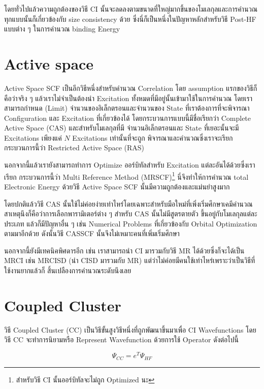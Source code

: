 โดยทั่วไปแล้วความถูกต้องของวิธี CI นั้นจะลดลงตามขนาดที่ใหญ่มากขึ้นของโมเลกุลและการคำนวณทุกแบบนั้นก็เกี่ยวข้องกับ
size consistency ด้วย ซึ่งนี่ก็เป็นหนึ่งในปัญหาหลักสำหรับวิธี Post-HF แบบต่าง ๆ ในการคำนวณ binding Energy

\section{Active space}

Active Space SCF เป็นอีกวิธีหนึ่งสำหรับคำนวณ Correlation โดย assumption แรกของวิธีก็คือว่าจริง ๆ
แล้วเราไม่จำเป็นต้องนำ Excitation ทั้งหมดที่มีอยู่นั้นเข้ามาใช้ในการคำนวณ โดยเราสามารถกำหนด (Limit)
จำนวนของอิเล็กตรอนและจำนวนของ State ที่เราต้องการที่จะพิจารณา Configuration และ Excitation
ที่เกี่ยวข้องได้ โดยกระบวนการแบบนี้มีชื่อเรียกว่า Complete Active Space (CAS) และสำหรับโมเลกุลที่มี%
จำนวนอิเล็กตรอนและ State ที่เยอะนั้นจะมี Excitations เพียงแค่ $N$ Excitations เท่านั้นที่จะถูก%
พิจารณาและคำนวณซึ่งเราจะเรียกกระบวนการนี้ว่า Restricted Active Space (RAS)

นอกจากนี้แล้วเรายังสามารถทำการ Optimize ออร์บิทัลสำหรับ Excitation แต่ละอันได้ด้วยซึ่งเราเรียก%
กระบวนการนี้ว่า Multi Reference Method (MRSCF)\footnote{สำหรับวิธี CI นั้นออร์บิทัลจะไม่ถูก 
Optimized นะ} นี่จึงทำให้การคำนวณ total Electronic Energy ด้วยวิธี Active Space SCF
นั้นมีความถูกต้องและแม่นยำสูงมาก

โดยปกติแล้ววิธี CAS นั้นใช้ไม่ค่อยง่ายเท่าไหร่โดยเฉพาะสำหรับมือใหม่ที่เพิ่งเริ่มศึกษาเคมีคำนวณ
สาเหตุนึงก็คือว่าการเลือกพารามิเตอร์ต่าง ๆ สำหรับ CAS นั้นไม่มีสูตรตายตัว ขึ้นอยู่กับโมเลกุลแต่ละประเภท
แล้วก็มีปัญหาอื่น ๆ เช่น Numerical Problems ที่เกี่ยวข้องกับ Orbital Optimization ตามมาอีกด้วย
ดังนั้นวิธี CASSCF นั้นจึงไม่เหมาะคนที่เพิ่มเริ่มศึกษา

นอกจากนี้ยังมีเทคนิคพิศดารอีก เช่น เราสามารถนำ CI มารวมกับวิธี MR ได้ด้วยซึ่งก็จะได้เป็น MRCI
เช่น MRCISD (นำ CISD มารวมกับ MR) แต่ว่าไม่ค่อยมีคนใช้เท่าไหร่เพราะว่าเป็นวิธีที่ใช้งานยากแล้วก็%
สิ้นเปลืองการคำนวณระดับนึงเลย

\section{Coupled Cluster}

วิธี Coupled Cluster (CC) เป็นวิธีขั้นสูงวิธีหนึ่งที่ถูกพัฒนาขึ้นมาเพื่อ CI Wavefunctions
โดยวิธี CC จะทำการนิยามหรือ Represent Wavefunction ด้วยการใช้ Operator ดังต่อไปนี้

\begin{equation}
    \Psi_{CC} = e^{T} \Psi_{HF}
\end{equation}

